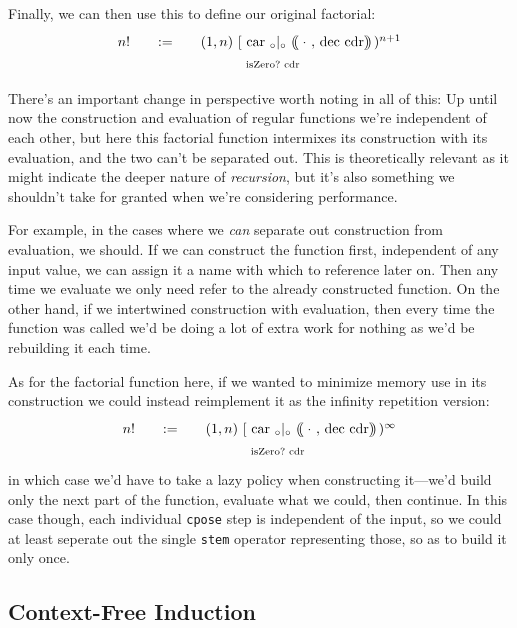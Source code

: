 \documentclass[twoside]{article}
\newcommand{\qdefeq}{\ensuremath{\quad :=\quad}}
\newcommand{\doublechar}[2]{#2\hspace{#1}#2}
\newcommand{\shiftedchar}[3]{\hspace{#1}\raisebox{#2}{#3}}
\newcommand{\after}[1]{\hspace{#1}}
\newcommand{\ldp}{\ensuremath{
\doublechar{-0.5ex}{(}
\shiftedchar{-0.35ex}{1.00ex}{$\scriptscriptstyle \bar{ }$}
\shiftedchar{-0ex}{-1.25ex}{$\scriptscriptstyle \bar{ }$}
\after{0.55ex}
}}
\newcommand{\rdp}{\ensuremath{
\doublechar{-0.5ex}{)}
\shiftedchar{-1.00ex}{1.00ex}{$\scriptscriptstyle \bar{ }$}
\shiftedchar{-0ex}{-1.25ex}{$\scriptscriptstyle \bar{ }$}
\after{0.95ex}
}}
\newcommand{\car}{\mbox{car}}
\newcommand{\cdr}{\mbox{cdr}}
\newcommand{\dec}{\mbox{dec}}
\newcommand{\isZero}{\mbox{isZero?}}
\begin{document}
Finally, we can then use this to define our original factorial:
$$ \def\arraystretch{1.2}
\begin{array}{rcl}
n! & \qdefeq	& (1,n)\ [\ \car\ _\circ|_\circ\ \ldp\,\cdot\ ,\,\dec\ \cdr\rdp\,)^{n+1}		\\
   &		& \hspace{7.5ex}\scriptsize \isZero\ \cdr
\end{array} $$

There's an important change in perspective worth noting in all of this: Up until now the construction and evaluation
of regular functions we're independent of each other, but here this factorial function intermixes its construction with
its evaluation, and the two can't be separated out. This is theoretically relevant as it might indicate the deeper nature
of \emph{recursion}, but it's also something we shouldn't take for granted when we're considering performance.

For example, in the cases where we \emph{can} separate out construction from evaluation, we should. If we can construct
the function first, independent of any input value, we can assign it a name with which to reference later on. Then any
time we evaluate we only need refer to the already constructed function. On the other hand, if we intertwined construction
with evaluation, then every time the function was called we'd be doing a lot of extra work for nothing as we'd be rebuilding
it each time.

As for the factorial function here, if we wanted to minimize memory use in
its construction we could instead reimplement it as the infinity repetition version:
$$ \def\arraystretch{1.2}
\begin{array}{rcl}
n! & \qdefeq	& (1,n)\ [\ \car\ _\circ|_\circ\ \ldp\,\cdot\ ,\,\dec\ \cdr\rdp\,)^\infty		\\
   &		& \hspace{7.5ex}\scriptsize \isZero\ \cdr
\end{array} $$
in which case we'd have to take a lazy policy when constructing it---we'd build only the next part of the function,
evaluate what we could, then continue. In this case though, each individual \texttt{cpose} step is independent of the input,
so we could at least seperate out the single \texttt{stem} operator representing those, so as to build it only once.

\subsection*{Context-Free Induction}
\end{document}
